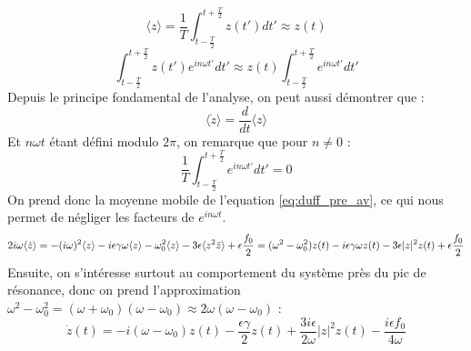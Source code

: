 \begin{equation}
    \langle z \rangle = \frac{1}{T}\int_{t-\frac{T}{2}}^{t+\frac{T}{2}}{z(t')}dt' \approx  z(t)
\end{equation}
\begin{equation}
    \int_{t-\frac{T}{2}}^{t+\frac{T}{2}}{z(t')e^{in\omega t'}}dt'  \approx z(t) \int_{t-\frac{T}{2}}^{t+\frac{T}{2}}{e^{in\omega t'}}dt'
\end{equation}
%
Depuis le principe fondamental de l'analyse, on peut aussi démontrer que :
%
\begin{equation}
    \langle \dot{z} \rangle = \frac{d}{dt} \langle z \rangle
\end{equation}
%
Et $n \omega t$ étant défini modulo $2\pi$, on remarque que pour $n \neq 0$ :
\begin{equation*}
    \frac{1}{T}\int_{t-\frac{T}{2}}^{t+\frac{T}{2}}{e^{in\omega t'}}dt' = 0
\end{equation*}
%
On prend donc la moyenne mobile de l'equation \eqref{eq:duff_pre_av}, 
ce qui nous permet de négliger les facteurs de $e^{i n\omega t}$.
\begin{dmath}
    2i\omega \langle \dot{z} \rangle = - (i\omega)^2 \langle z \rangle
    - i\epsilon\gamma\omega \langle z \rangle
    - \omega_0^2 \langle z \rangle 
    - 3 \epsilon \langle z^2 \bar{z} \rangle
    + \epsilon \frac{f_0}{2} \\
    = (\omega^2 - \omega_0^2)z(t) - i\epsilon\gamma\omega z(t) - 3\epsilon |z|^2 z(t) + \epsilon \frac{f_0}{2}
\end{dmath}
%
Ensuite, on s'intéresse surtout au comportement du système près du pic de résonance, 
donc on prend l'approximation $\omega^2 - \omega_0^2 = (\omega + \omega_0)(\omega - \omega_0) \approx 2\omega(\omega - \omega_0)$ :
%
\begin{dmath}
    \dot{z}(t) = -i(\omega - \omega_0)z(t)
    - \frac{\epsilon\gamma}{2} z(t) + \frac{3i\epsilon}{2\omega}|z|^2z(t) - \frac{i\epsilon f_0}{4\omega}
\end{dmath}
%
